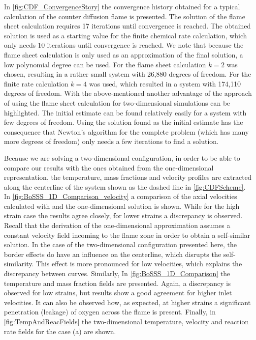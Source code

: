 In \cref{fig:CDF_ConvergenceStory} the convergence history obtained for a typical calculation of the counter diffusion flame is presented. The solution of the flame sheet calculation requires 17 iterations until convergence is reached. The obtained solution is used as a starting value for the finite chemical rate calculation, which only needs 10 iterations until convergence is reached. We note that because the flame sheet calculation is only used as an approximation of the final solution, a low polynomial degree can be used. For the flame sheet calculation $k = 2$ was chosen, resulting in a rather small system with 26,880 degrees of freedom. For the finite rate calculation $k = 4$ was used, which resulted in a system with 174,110 degrees of freedom.  With the above-mentioned another advantage of the approach of using the flame sheet calculation for two-dimensional simulations can be highlighted. The initial estimate can be found relatively easily for a system with few degrees of freedom. Using the solution found as the initial estimate has the consequence that Newton's algorithm for the complete problem (which has many more degrees of freedom) only needs a few iterations to find a solution.

Because we are solving a two-dimensional configuration, in order to be able to compare our results with the ones obtained from the one-dimensional representation, the temperature, mass fractions and velocity profiles are extracted along the centerline of the system shown as the dashed line in \cref{fig:CDFScheme}. In \cref{fig:BoSSS_1D_Comparison_velocity} a comparison of the axial velocities calculated with \BoSSS and the one-dimensional solution is shown. While for the high strain case the results agree closely, for lower strains a discrepancy is observed. Recall that the derivation of the one-dimensional approximation assumes a constant velocity field incoming to the flame zone in order to obtain a self-similar solution. In the case of the two-dimensional configuration presented here, the border effects do have an influence on the centerline, which disrupts the self-similarity. This effect is more pronounced for low velocities, which explains the discrepancy between curves. Similarly, In \cref{fig:BoSSS_1D_Comparison} the temperature and mass fraction fields are presented. Again, a discrepancy is observed for low strains, but results show a good agreement for higher inlet velocities. It can also be observed how, as expected, \cite{fernandez-tarrazoSimpleOnestepChemistry2006} at higher strains a significant penetration (leakage) of oxygen across the flame is present. Finally, in \cref{fig:TempAndReacFields} the two-dimensional temperature, velocity and reaction rate fields for the case (a) are shown.

